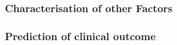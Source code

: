 \subsubsection{Characterisation of other Factors}

\subsubsection{Prediction of clinical outcome}


